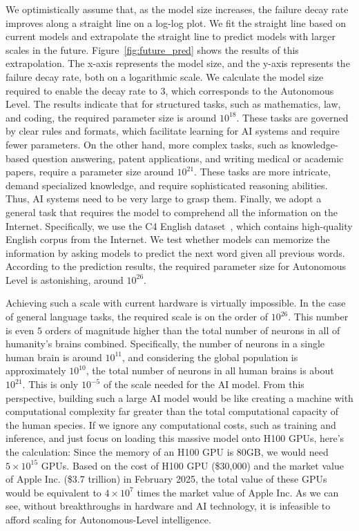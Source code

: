 We optimistically assume that, as the model size increases, the failure decay rate improves along a straight line on a log-log plot. We fit the straight line based on current models and extrapolate the straight line to predict models with larger scales in the future. Figure~\ref{fig:future_pred} shows the results of this extrapolation. The x-axis represents the model size, and the y-axis represents the failure decay rate, both on a logarithmic scale. We calculate the model size required to enable the decay rate to $3$, which corresponds to the Autonomous Level.
The results indicate that for structured tasks, such as mathematics, law, and coding, the required parameter size is around $10^{18}$. These tasks are governed by clear rules and formats, which facilitate learning for AI systems and require fewer parameters. On the other hand, more complex tasks, such as knowledge-based question answering, patent applications, and writing medical or academic papers, require a parameter size around $10^{21}$. These tasks are more intricate, demand specialized knowledge, and require sophisticated reasoning abilities. Thus, AI systems need to be very large to grasp them.
Finally, we adopt a general task that requires the model to comprehend all the information on the Internet. Specifically, we use the C4 English dataset~\citep{raffel2020exploring}, which contains high-quality English corpus from the Internet. We test whether models can memorize the information by asking models to predict the next word given all previous words. According to the prediction results, the required parameter size for Autonomous Level is astonishing, around $10^{26}$.


Achieving such a scale with current hardware is virtually impossible. In the case of general language tasks, the required scale is on the order of $10^{26}$. This number is even $5$ orders of magnitude higher than the total number of neurons in all of humanity's brains combined. Specifically, the number of neurons in a single human brain is around $10^{11}$, and considering the global population is approximately $10^{10}$, the total number of neurons in all human brains is about $10^{21}$. This is only $10^{-5}$ of the scale needed for the AI model. From this perspective, building such a large AI model would be like creating a machine with computational complexity far greater than the total computational capacity of the human species. 
If we ignore any computational costs, such as training and inference, and just focus on loading this massive model onto H100 GPUs, here's the calculation: Since the memory of an H100 GPU is 80GB, we would need $5 \times 10^{15}$ GPUs. Based on the cost of H100 GPU (\$30,000) and the market value of Apple Inc. (\$3.7 trillion) in February 2025, the total value of these GPUs would be equivalent to $4 \times 10^7$ times the market value of Apple Inc. As we can see, without breakthroughs in hardware and AI technology, it is infeasible to afford scaling for Autonomous-Level intelligence.

